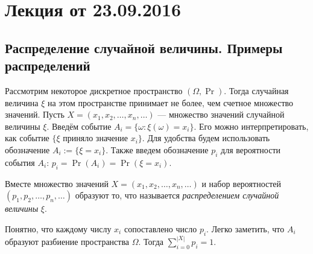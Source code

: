 \section{Лекция от 23.09.2016}
\subsection{Распределение случайной величины. Примеры распределений}
Рассмотрим некоторое дискретное пространство \((\Omega, \Pr)\). Тогда случайная величина \(\xi\) на этом пространстве принимает не более, чем счетное множество значений. Пусть \(X = (x_1, x_2, \ldots, x_n, \ldots)\) --- множество значений случайной величины \(\xi\). Введём событие \(A_i = \{\omega : \xi(\omega) = x_i\}\). Его можно интерпретировать, как событие \(\{\xi\) приняло значение \(x_i\}\). Для удобства будем использовать обозначение \(A_i := \{\xi = x_i\}\). Также введем обозначение \(p_i\) для вероятности события \(A_i\): \(p_i = \Pr(A_i) = \Pr(\xi = x_i)\).

\begin{definition}
    Вместе множество значений \(X = (x_1, x_2, \ldots, x_n, \ldots)\) и набор вероятностей \((p_1, p_2, \ldots, p_n, \ldots)\) образуют то, что называется \emph{распределением случайной величины} \(\xi\).
\end{definition}
Понятно, что каждому числу \(x_i\) сопоставлено число \(p_i\). Легко заметить, что \(A_i\) образуют разбиение пространства \(\Omega\). Тогда \(\sum\limits_{i = 0}^{|X|} p_i = 1\).

